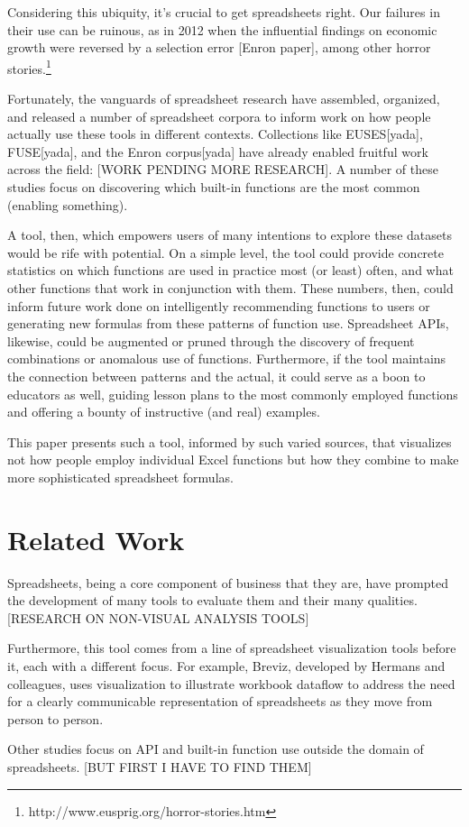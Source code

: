\documentclass[conference]{IEEEtran}
\begin{document}
Considering this ubiquity, it's crucial to get spreadsheets right. Our failures in their use can be ruinous, as in 2012 when the influential findings on economic growth were reversed by a selection error [Enron paper], among other horror stories.\footnote{http://www.eusprig.org/horror-stories.htm}

Fortunately, the vanguards of spreadsheet research have assembled, organized, and released a number of spreadsheet corpora to inform work on how people actually use these tools in different contexts. Collections like EUSES[yada], FUSE[yada], and the Enron corpus[yada] have already enabled fruitful work across the field: [WORK PENDING MORE RESEARCH]. A number of these studies focus on discovering which built-in functions are the most common (enabling something). \par

A tool, then, which empowers users of many intentions to explore these datasets would be rife with potential. On a simple level, the tool could provide concrete statistics on which functions are used in practice most (or least) often, and what other functions that work in conjunction with them. These numbers, then, could inform future work done on intelligently recommending functions to users or generating new formulas from these patterns of function use. Spreadsheet APIs, likewise, could be augmented or pruned through the discovery of frequent combinations or anomalous use of functions. Furthermore, if the tool maintains the connection between patterns and the actual, it could serve as a boon to educators as well, guiding lesson plans to the most commonly employed functions and offering a bounty of instructive (and real) examples.\par
This paper presents such a tool, informed by such varied sources, that visualizes not how people employ individual Excel functions but how they combine to make more sophisticated spreadsheet formulas. 


\section{Related Work}
Spreadsheets, being a core component of business that they are, have prompted the development of many tools to evaluate them and their many qualities. [RESEARCH ON NON-VISUAL ANALYSIS TOOLS] \par
Furthermore, this tool comes from a line of spreadsheet visualization tools before it, each with a different focus. For example, Breviz, developed by Hermans and colleagues, uses visualization to illustrate workbook dataflow to address the need for a clearly communicable representation of spreadsheets as they move from person to person. \par
Other studies focus on API and built-in function use outside the domain of spreadsheets. [BUT FIRST I HAVE TO FIND THEM]  
\end{document}
